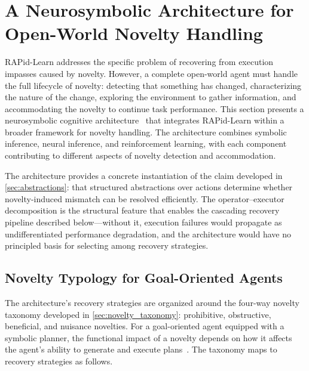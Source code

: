 \section[Neurosymbolic Architecture for Novelty Handling]{A Neurosymbolic Architecture for Open-World Novelty Handling}
\label{sec:architecture}

RAPid-Learn addresses the specific problem of recovering from execution impasses caused by novelty. However, a complete open-world agent must handle the full lifecycle of novelty: detecting that something has changed, characterizing the nature of the change, exploring the environment to gather information, and accommodating the novelty to continue task performance. This section presents a neurosymbolic cognitive architecture~\citep{goel2024neurosymbolic} that integrates RAPid-Learn within a broader framework for novelty handling. The architecture combines symbolic inference, neural inference, and reinforcement learning, with each component contributing to different aspects of novelty detection and accommodation.

The architecture provides a concrete instantiation of the claim developed in \cref{sec:abstractions}: that structured abstractions over actions determine whether novelty-induced mismatch can be resolved efficiently. The operator--executor decomposition is the structural feature that enables the cascading recovery pipeline described below---without it, execution failures would propagate as undifferentiated performance degradation, and the architecture would have no principled basis for selecting among recovery strategies.

\subsection{Novelty Typology for Goal-Oriented Agents}
\label{sec:novelty_typology}

The architecture's recovery strategies are organized around the four-way novelty taxonomy developed in \cref{sec:novelty_taxonomy}: prohibitive, obstructive, beneficial, and nuisance novelties. For a goal-oriented agent equipped with a symbolic planner, the functional impact of a novelty depends on how it affects the agent's ability to generate and execute plans~\citep{goel2024neurosymbolic}. The taxonomy maps to recovery strategies as follows.

